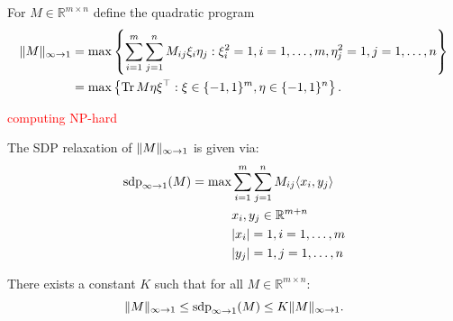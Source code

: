 	\begin{dfn}
		For $M\in\mathbb{R}^{m\times n}$ define the quadratic program
		\begin{align}
			 \Vert {M} \Vert_{\infty\to 1} &= \max \left\{ \sum_{i=1}^m \sum_{j=1}^n M_{ij} \xi_i \eta_j : \xi_i^2=1, i=1,\dots,m, \eta_j^2=1, j =1,\dots,n \right\} \nonumber\\ 
			&=\max\left\{\textup{Tr} \, {M \eta\xi^\top } : \xi\in\{-1,1\}^m,\eta\in\{-1,1\}^n\right\}.
		\end{align}
	\end{dfn}
	\textcolor{red}{computing NP-hard}
	\begin{dfn} The SDP relaxation of $ \Vert {M} \Vert_{\infty\to1}$ is given via:
		\begin{align*}
			\operatorname{sdp}_{\infty\to 1} (M) = \max 
			&\sum_{i=1}^m\sum_{j=1}^n M_{ij} \langle{x_i},{y_j}\rangle\\
			&x_i,y_j\in\mathbb{R}^{m+n}\\
			&{\left|{x_i}\right|}=1, i=1,\dots,m\\
			&{\left|{y_j}\right|}=1, j=1,\dots,n
		\end{align*}
	\end{dfn}
	\begin{theo} \label{theo:G_ineq}
		There exists a constant $K$ such that for all $M\in\mathbb{R}^{m\times n}$:
		\begin{equation}
			 \Vert {M} \Vert_{\infty\to 1} \leq \operatorname{sdp}_{\infty\to 1} (M) \leq K  \Vert {M} \Vert_{\infty\to 1}.
		\end{equation}
	\end{theo}
